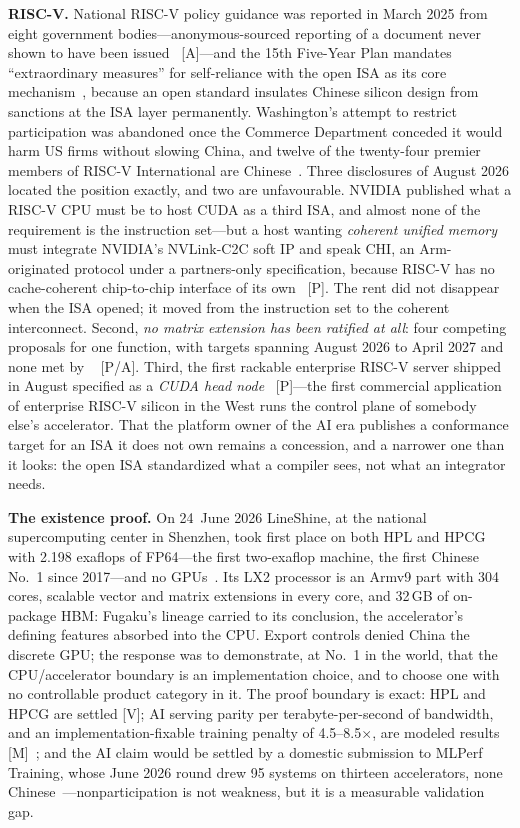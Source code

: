 \textbf{RISC-V.} National RISC-V policy guidance was reported in March 2025 from eight government bodies---anonymous-sourced reporting of a document never shown to have been issued~\cite{riscv-policy} [A]---and the 15th Five-Year Plan mandates ``extraordinary measures'' for self-reliance with the open ISA as its core mechanism~\cite{fyp15}, because an open standard insulates Chinese silicon design from sanctions at the ISA layer permanently. Washington's attempt to restrict participation was abandoned once the Commerce Department conceded it would harm US firms without slowing China, and twelve of the twenty-four premier members of RISC-V International are Chinese~\cite{csis-riscv}. Three disclosures of August 2026 located the position exactly, and two are unfavourable. NVIDIA published what a RISC-V CPU must be to host CUDA as a third ISA, and almost none of the requirement is the instruction set---but a host wanting \emph{coherent unified memory} must integrate NVIDIA's NVLink-C2C soft IP and speak CHI, an Arm-originated protocol under a partners-only specification, because RISC-V has no cache-coherent chip-to-chip interface of its own~\cite{hc2026-nv-riscv} [P]. The rent did not disappear when the ISA opened; it moved from the instruction set to the coherent interconnect. Second, \emph{no matrix extension has been ratified at all}: four competing proposals for one function, with targets spanning August 2026 to April 2027 and none met by \datafreeze~\cite{hc2026-riscv-profiles} [P/A]. Third, the first rackable enterprise RISC-V server shipped in August specified as a \emph{CUDA head node}~\cite{sifive-bigsky} [P]---the first commercial application of enterprise RISC-V silicon in the West runs the control plane of somebody else's accelerator. That the platform owner of the AI era publishes a conformance target for an ISA it does not own remains a concession, and a narrower one than it looks: the open ISA standardized what a compiler sees, not what an integrator needs.

\textbf{The existence proof.} On 24~June 2026 LineShine, at the national supercomputing center in Shenzhen, took first place on both HPL and HPCG with 2.198 exaflops of FP64---the first two-exaflop machine, the first Chinese No.~1 since 2017---and no GPUs~\cite{top500-lineshine,dongarra-report}. Its LX2 processor is an Armv9 part with 304 cores, scalable vector and matrix extensions in every core, and 32\,GB of on-package HBM: Fugaku's lineage carried to its conclusion, the accelerator's defining features absorbed into the CPU. Export controls denied China the discrete GPU; the response was to demonstrate, at No.~1 in the world, that the CPU/accelerator boundary is an implementation choice, and to choose one with no controllable product category in it. The proof boundary is exact: HPL and HPCG are settled [V]; AI serving parity per terabyte-per-second of bandwidth, and an implementation-fixable training penalty of 4.5--8.5$\times$, are modeled results [M]~\cite{dhm-cacm,dhm-long}; and the AI claim would be settled by a domestic submission to MLPerf Training, whose June 2026 round drew 95 systems on thirteen accelerators, none Chinese~\cite{mlperf-v6}---nonparticipation is not weakness, but it is a measurable validation gap.

